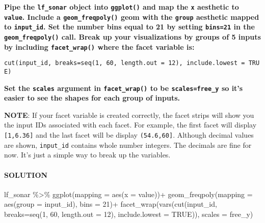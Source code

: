 \documentclass[
]{article}
\newenvironment{Shaded}{\begin{snugshade}}{\end{snugshade}}
\newcommand{\AttributeTok}[1]{\textcolor[rgb]{0.77,0.63,0.00}{#1}}
\newcommand{\ConstantTok}[1]{\textcolor[rgb]{0.00,0.00,0.00}{#1}}
\newcommand{\DecValTok}[1]{\textcolor[rgb]{0.00,0.00,0.81}{#1}}
\newcommand{\FunctionTok}[1]{\textcolor[rgb]{0.00,0.00,0.00}{#1}}
\newcommand{\NormalTok}[1]{#1}
\newcommand{\SpecialCharTok}[1]{\textcolor[rgb]{0.00,0.00,0.00}{#1}}
\newcommand{\StringTok}[1]{\textcolor[rgb]{0.31,0.60,0.02}{#1}}
\begin{document}
\textbf{Pipe the \texttt{lf\_sonar} object into \texttt{ggplot()} and
map the \texttt{x} aesthetic to \texttt{value}. Include a
\texttt{geom\_freqpoly()} geom with the \texttt{group} aesthetic mapped
to \texttt{input\_id}. Set the number bins equal to 21 by setting
\texttt{bins=21} in the \texttt{geom\_freqpoly()} call. Break up your
visualizations by groups of 5 inputs by including \texttt{facet\_wrap()}
where the facet variable is:}

\texttt{cut(input\_id,\ breaks=seq(1,\ 60,\ length.out\ =\ 12),\ include.lowest\ =\ TRUE)}

\textbf{Set the \texttt{scales} argument in \texttt{facet\_wrap()} to be
\texttt{scales=\textquotesingle{}free\_y\textquotesingle{}} so it's
easier to see the shapes for each group of inputs.}

\textbf{NOTE}: If your facet variable is created correctly, the facet
strips will show you the input IDs associated with each facet. For
example, the first facet will display \texttt{{[}1,6.36{]}} and the last
facet will be display \texttt{(54.6,60{]}}. Although decimal values are
shown, \texttt{input\_id} contains whole number integers. The decimals
are fine for now. It's just a simple way to break up the variables.

\hypertarget{solution-1}{%
\paragraph{SOLUTION}\label{solution-1}}

\begin{Shaded}
\begin{Highlighting}[]
\NormalTok{lf\_sonar }\SpecialCharTok{\%\textgreater{}\%}
  \FunctionTok{ggplot}\NormalTok{(}\AttributeTok{mapping =} \FunctionTok{aes}\NormalTok{(}\AttributeTok{x =}\NormalTok{ value))}\SpecialCharTok{+}
  \FunctionTok{geom\_freqpoly}\NormalTok{(}\AttributeTok{mapping =} \FunctionTok{aes}\NormalTok{(}\AttributeTok{group =}\NormalTok{ input\_id), }\AttributeTok{bins =} \DecValTok{21}\NormalTok{)}\SpecialCharTok{+}
  \FunctionTok{facet\_wrap}\NormalTok{(}\FunctionTok{vars}\NormalTok{(}\FunctionTok{cut}\NormalTok{(input\_id, }\AttributeTok{breaks=}\FunctionTok{seq}\NormalTok{(}\DecValTok{1}\NormalTok{, }\DecValTok{60}\NormalTok{, }\AttributeTok{length.out =} \DecValTok{12}\NormalTok{), }\AttributeTok{include.lowest =} \ConstantTok{TRUE}\NormalTok{)), }
             \AttributeTok{scales =} \StringTok{\textquotesingle{}free\_y\textquotesingle{}}\NormalTok{)}
\end{Highlighting}
\end{Shaded}
\end{document}
